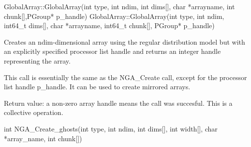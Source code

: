 \documentclass[12pt]{article}
\begin{document}
\begin{cxxapi}
\begin{cxxcode}
GlobalArray::GlobalArray(int type, int ndim, int dims[], char *arrayname,
                         int chunk[],PGroup* p_handle)
GlobalArray::GlobalArray(int type, int ndim, int64_t dims[], char *arrayname,
                         int64_t chunk[], PGroup* p_handle)
\end{cxxcode}
\begin{funcargs}
\end{funcargs}
\end{cxxapi}

\begin{desc}

  Creates an ndim-dimensional array using the regular distribution
  model but with an explicitly specified processor list handle and
  returns an integer handle representing the array.

  This call is essentially the same as the NGA_Create call, except for
  the processor list handle p_handle. It can be used to create
  mirrored arrays.

  Return value: a non-zero array handle means the call was succesful.
  This is a collective operation.

\end{desc}


\begin{capi}
\begin{ccode}
int NGA_Create_ghosts(int type, int ndim, int dims[], int width[],
                      char *array_name, int chunk[])
\end{ccode}
\begin{funcargs}
\end{funcargs}
\end{capi}
\end{document}

